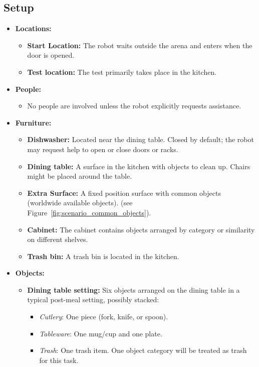 \subsection*{Setup}
\begin{itemize}[nosep]
	\item \textbf{Locations:}
		\begin{itemize}
			\item \textbf{Start Location:} The robot waits outside the arena and enters when the door is opened.
			\item \textbf{Test location:} The test primarily takes place in the kitchen.
		\end{itemize}
	\item \textbf{People:}
		\begin{itemize}
			\item No people are involved unless the robot explicitly requests assistance.
		\end{itemize}
	\item \textbf{Furniture:}
		\begin{itemize}
			\item \textbf{Dishwasher:} Located near the dining table. Closed by default; the robot may request help to open or close doors or racks.
			\item \textbf{Dining table:} A surface in the kitchen with objects to clean up. Chairs might be placed around the table.
			\item \textbf{Extra Surface:} A fixed position surface with common objects (worldwide available objects). (see Figure~\ref{fig:scenario_common_objects}).
			\item \textbf{Cabinet:} The cabinet contains objects arranged by category or similarity on different shelves.
			\item \textbf{Trash bin:} A trash bin is located in the kitchen.
		\end{itemize}
	\item \textbf{Objects:}
		\begin{itemize}
			\item \textbf{Dining table setting:} Six objects arranged on the dining table in a typical post-meal setting, possibly stacked:
			\begin{itemize}[nosep]
				\item \textit{Cutlery}: One piece (fork, knife, or spoon).
				\item \textit{Tableware}: One mug/cup and one plate.
				\item \textit{Trash}: One trash item. One object category will be treated as trash for this task.

\end{itemize}
\end{itemize}
\end{itemize}
